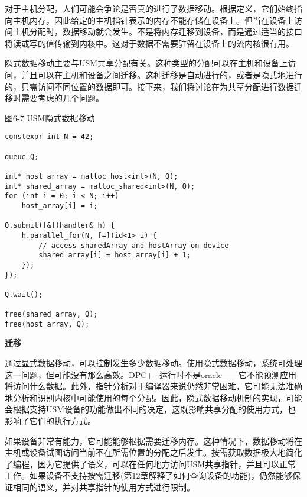 对于主机分配，人们可能会争论是否真的进行了数据移动。根据定义，它们始终指向主机内存，因此给定的主机指针表示的内存不能存储在设备上。但当在设备上访问主机分配时，数据移动就会发生。不是将内存迁移到设备，而是通过适当的接口将读或写的值传输到内核中。这对于数据不需要驻留在设备上的流内核很有用。\par

隐式数据移动主要与USM共享分配有关。这种类型的分配可以在主机和设备上访问，并且可以在主机和设备之间迁移。这种迁移是自动进行的，或者是隐式地进行的，只需访问不同位置的数据即可。接下来，我们将讨论在为共享分配进行数据迁移时需要考虑的几个问题。\par

\hspace*{\fill} \par %
图6-7 USM隐式数据移动
\begin{lstlisting}[caption={}]
constexpr int N = 42;

queue Q;

int* host_array = malloc_host<int>(N, Q);
int* shared_array = malloc_shared<int>(N, Q);
for (int i = 0; i < N; i++)
	host_array[i] = i;
	
Q.submit([&](handler& h) {
	h.parallel_for(N, [=](id<1> i) {
		// access sharedArray and hostArray on device
		shared_array[i] = host_array[i] + 1;
	});
});

Q.wait();

free(shared_array, Q);
free(host_array, Q);
\end{lstlisting}

\hspace*{\fill} \par %
\textbf{迁移}

通过显式数据移动，可以控制发生多少数据移动。使用隐式数据移动，系统可处理这一问题，但可能没有那么高效。DPC++运行时不是oracle——它不能预测应用将访问什么数据。此外，指针分析对于编译器来说仍然非常困难，它可能无法准确地分析和识别内核中可能使用的每个分配。因此，隐式数据移动机制的实现，可能会根据支持USM设备的功能做出不同的决定，这既影响共享分配的使用方式，也影响了它们的执行方式。\par

如果设备非常有能力，它可能能够根据需要迁移内存。这种情况下，数据移动将在主机或设备试图访问当前不在所需位置的分配之后发生。按需获取数据极大地简化了编程，因为它提供了语义，可以在任何地方访问USM共享指针，并且可以正常工作。如果设备不支持按需迁移(第12章解释了如何查询设备的功能)，仍然能够保证相同的语义，并对共享指针的使用方式进行限制。\par

